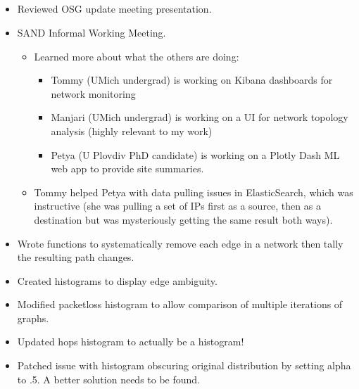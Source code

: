 \documentclass{weeklyreport}
\begin{document}
\subsection*{}

\begin{itemize}
	\item Reviewed OSG update meeting presentation.
	\item SAND Informal Working Meeting. 
	\begin{itemize}
		\item Learned more about what the others are doing:
		\begin{itemize}
			\item Tommy (UMich undergrad) is working on Kibana dashboards for network monitoring
			\item Manjari (UMich undergrad) is working on a UI for network topology analysis (highly relevant to my work)
			\item Petya (U Plovdiv PhD candidate) is working on a Plotly Dash ML web app to provide site summaries.
		\end{itemize}
		\item Tommy helped Petya with data pulling issues in ElasticSearch, which was instructive (she was pulling a set of IPs first as a source, then as a destination but was mysteriously getting the same result both ways).
	\end{itemize}
	\item Wrote functions to systematically remove each edge in a network then tally the resulting path changes.
	\item Created histograms to display edge ambiguity.
	\item Modified packetloss histogram to allow comparison of multiple iterations of graphs.
	\item Updated hops histogram to actually be a histogram!
	\item Patched issue with histogram obscuring original distribution by setting alpha to .5. A better solution needs to be found.
\end{itemize}


\subsection*{}
\end{document}
